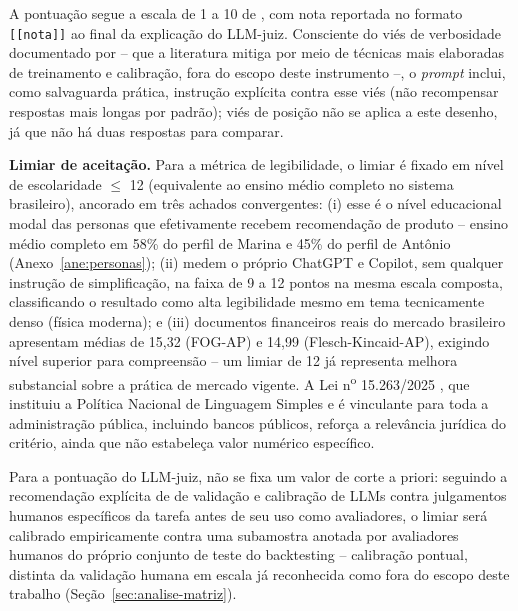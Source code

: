 A pontua\c{c}\~ao segue a escala de 1 a 10 de \textcite{zheng2023}, com
nota reportada no formato \texttt{[[nota]]} ao final da explica\c{c}\~ao
do LLM-juiz. Consciente do vi\'es de verbosidade documentado por
\textcite{li2024llmjudges} -- que a literatura mitiga por meio de
t\'ecnicas mais elaboradas de treinamento e calibra\c{c}\~ao, fora do
escopo deste instrumento --, o \textit{prompt} inclui, como
salvaguarda pr\'atica, instru\c{c}\~ao expl\'icita contra esse vi\'es
(n\~ao recompensar respostas mais longas por padr\~ao); vi\'es de
posi\c{c}\~ao n\~ao se aplica a este desenho, j\'a que n\~ao h\'a duas
respostas para comparar.

\textbf{Limiar de aceita\c{c}\~ao.} Para a m\'etrica de legibilidade, o
limiar \'e fixado em n\'ivel de escolaridade $\leq$ 12 (equivalente ao
ensino m\'edio completo no sistema brasileiro), ancorado em tr\^es
achados convergentes: (i) esse \'e o n\'ivel educacional modal das
personas que efetivamente recebem recomenda\c{c}\~ao de produto --
ensino m\'edio completo em 58\% do perfil de Marina e 45\% do perfil
de Ant\^onio (Anexo~\ref{ane:personas}); (ii) \textcite{martins2025fisica}
medem o pr\'oprio ChatGPT e Copilot, sem qualquer instru\c{c}\~ao de
simplifica\c{c}\~ao, na faixa de 9 a 12 pontos na mesma escala
composta, classificando o resultado como alta legibilidade mesmo em
tema tecnicamente denso (f\'isica moderna); e (iii) documentos
financeiros reais do mercado brasileiro \autocite{cunha2026}
apresentam m\'edias de 15,32 (FOG-AP) e 14,99 (Flesch-Kincaid-AP),
exigindo n\'ivel superior para compreens\~ao -- um limiar de 12 j\'a
representa melhora substancial sobre a pr\'atica de mercado vigente. A
Lei n\textsuperscript{o} 15.263/2025 \autocite{lei15263}, que instituiu
a Pol\'itica Nacional de Linguagem Simples e \'e vinculante para toda a
administra\c{c}\~ao p\'ublica, incluindo bancos p\'ublicos, refor\c{c}a
a relev\^ancia jur\'idica do crit\'erio, ainda que n\~ao estabele\c{c}a
valor num\'erico espec\'ifico.

Para a pontua\c{c}\~ao do LLM-juiz, n\~ao se fixa um valor de corte a
priori: seguindo a recomenda\c{c}\~ao expl\'icita de
\textcite{bavaresco2025} de valida\c{c}\~ao e calibra\c{c}\~ao de LLMs
contra julgamentos humanos espec\'ificos da tarefa antes de seu uso
como avaliadores, o limiar ser\'a calibrado empiricamente contra uma
subamostra anotada por avaliadores humanos do pr\'oprio conjunto de
teste do backtesting -- calibra\c{c}\~ao pontual, distinta da
valida\c{c}\~ao humana em escala j\'a reconhecida como fora do escopo
deste trabalho (Se\c{c}\~ao~\ref{sec:analise-matriz}).
